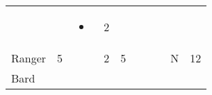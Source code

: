 \documentclass[12pt]{article}
\newcommand{\indexClass}[1]{\index{#1}}
\newcommand{\class}[1]{#1\indexClass{#1}}
\begin{document}
\begin{longtable}[]{@{}llllllllll@{}}
\begin{minipage}[t]{0.06\columnwidth}\raggedright\strut
\strut\end{minipage} &
\begin{minipage}[t]{0.06\columnwidth}\raggedright\strut
\strut\end{minipage} &
\begin{minipage}[t]{0.07\columnwidth}\raggedright\strut
\begin{itemize}
\item
\end{itemize}
\strut\end{minipage} &
\begin{minipage}[t]{0.08\columnwidth}\raggedright\strut
2
\strut\end{minipage}\tabularnewline
\begin{minipage}[t]{0.13\columnwidth}\raggedright\strut
\class{Ranger}
\strut\end{minipage} &
\begin{minipage}[t]{0.06\columnwidth}\raggedright\strut
5
\strut\end{minipage} &
\begin{minipage}[t]{0.06\columnwidth}\raggedright\strut
\strut\end{minipage} &
\begin{minipage}[t]{0.06\columnwidth}\raggedright\strut
2
\strut\end{minipage} &
\begin{minipage}[t]{0.06\columnwidth}\raggedright\strut
5
\strut\end{minipage} &
\begin{minipage}[t]{0.06\columnwidth}\raggedright\strut
\strut\end{minipage} &
\begin{minipage}[t]{0.06\columnwidth}\raggedright\strut
\strut\end{minipage} &
\begin{minipage}[t]{0.06\columnwidth}\raggedright\strut
\strut\end{minipage} &
\begin{minipage}[t]{0.07\columnwidth}\raggedright\strut
N
\strut\end{minipage} &
\begin{minipage}[t]{0.08\columnwidth}\raggedright\strut
12
\strut\end{minipage}\tabularnewline
\begin{minipage}[t]{0.13\columnwidth}\raggedright\strut
\class{Bard}
\strut\end{minipage} &

\end{longtable}
\end{document}
